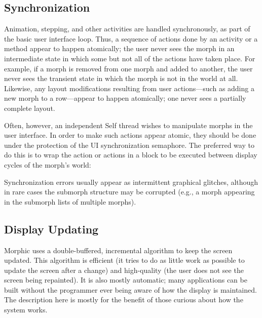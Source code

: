 \documentclass[letterpaper,10pt,english]{sphinxmanual}
\begin{document}
\subsection{Synchronization}
\label{\detokenize{morphic:synchronization}}
Animation, stepping, and other activities are handled synchronously, as part of the basic user interface loop. Thus, a sequence of actions done by an activity or a  method appear to happen atomically; the user never sees the morph in an intermediate state in which some but not all of the actions have taken place. For example, if a morph is removed from one morph and added to another, the user never sees the transient state in which the morph is not in the world at all. Likewise, any layout modifications resulting from user actions—such as adding a new morph to a row—appear to happen atomically; one never sees a partially complete layout.

Often, however, an independent Self thread wishes to manipulate morphs in the user interface. In order to make such actions appear atomic, they should be done under the protection of the UI synchronization semaphore. The preferred way to do this is to wrap the action or actions in a block to be executed between display cycles of the morph's world:

\begin{sphinxVerbatim}[commandchars=\\\{\}]
  \PYG{p}{[}  \PYG{p}{]}
\end{sphinxVerbatim}

Synchronization errors usually appear as intermittent graphical glitches, although in rare cases the submorph structure may be corrupted (e.g., a morph appearing in the submorph lists of multiple morphs).


\subsection{Display Updating}
\label{\detokenize{morphic:display-updating}}
Morphic uses a double-buffered, incremental algorithm to keep the screen updated. This algorithm is efficient (it tries to do as little work as possible to update the screen after a change) and high-quality (the user does not see the screen being repainted). It is also mostly automatic; many applications can be built without the programmer ever being aware of how the display is maintained. The description here is mostly for the benefit of those curious about how the system works.
\end{document}
